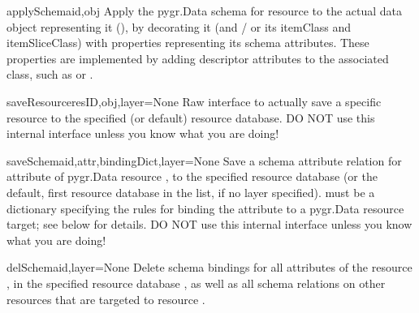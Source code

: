 \documentclass{howto}
\begin{document}
\begin{funcdesc}{applySchema}{id,obj}
  Apply the pygr.Data schema for resource  to the actual data
  object representing it (), by decorating it (and / or its itemClass
  and itemSliceClass) with properties representing its schema attributes.
  These properties are implemented by adding descriptor attributes to the
  associated class, such as  or .
\end{funcdesc}

\begin{funcdesc}{saveResource}{resID,obj,layer=None}
  Raw interface to actually save a specific resource to the specified
  (or default) resource database.
  DO NOT use this internal interface unless you know what you are doing!
\end{funcdesc}

\begin{funcdesc}{saveSchema}{id,attr,bindingDict,layer=None}
  Save a schema attribute relation for attribute  of pygr.Data
  resource , to the specified resource database  (or the default,
  first resource database in the list, if no layer specified).
   must be a dictionary specifying the rules for
  binding the attribute to a pygr.Data resource target; see below for details.
  DO NOT use this internal interface unless you know what you are doing!
\end{funcdesc}

\begin{funcdesc}{delSchema}{id,layer=None}
  Delete schema bindings for all attributes of the resource , in
  the specified resource database , as well as all schema relations
  on other resources that are targeted to resource .
\end{funcdesc}
\end{document}
